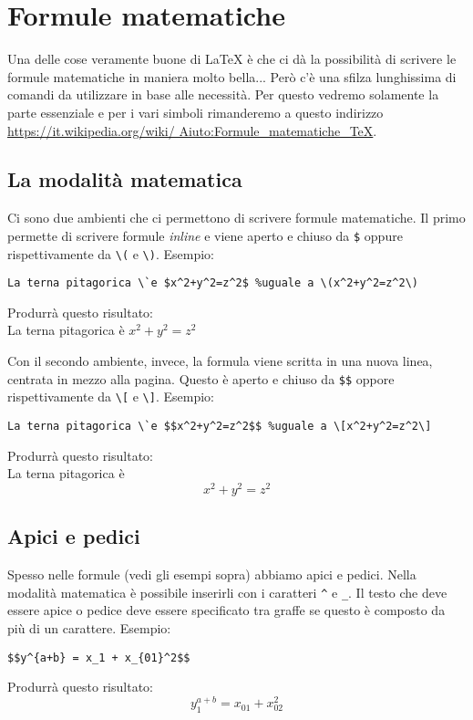 \chapter{Formule matematiche}
Una delle cose veramente buone di \LaTeX{} è che ci dà la possibilità di 
scrivere le formule matematiche in maniera molto bella... Però c'è una sfilza 
lunghissima di comandi da utilizzare in base alle necessità. Per questo 
vedremo solamente la parte essenziale e per i vari simboli rimanderemo a 
questo indirizzo \url{https://it.wikipedia.org/wiki/
Aiuto:Formule_matematiche_TeX}.

\section{La modalità matematica}
Ci sono due ambienti che ci permettono di scrivere formule matematiche. Il 
primo permette di scrivere formule \textit{inline} e viene aperto e chiuso da 
\verb!$! oppure rispettivamente da \verb!\(! e \verb!\)!. Esempio:
\begin{lstlisting}
La terna pitagorica \`e $x^2+y^2=z^2$ %uguale a \(x^2+y^2=z^2\)
\end{lstlisting}
Produrrà questo risultato:\\
La terna pitagorica \`e $x^2+y^2=z^2$
\\ \par
Con il secondo ambiente, invece, la formula viene scritta in una nuova linea, 
centrata in mezzo alla pagina. Questo è aperto e chiuso da \verb!$$! oppore 
rispettivamente da \verb!\[! e \verb!\]!. Esempio:
\begin{lstlisting}
La terna pitagorica \`e $$x^2+y^2=z^2$$ %uguale a \[x^2+y^2=z^2\]
\end{lstlisting}
Produrrà questo risultato:\\
La terna pitagorica \`e $$x^2+y^2=z^2$$

\section{Apici e pedici}
Spesso nelle formule (vedi gli esempi sopra) abbiamo apici e pedici. Nella 
modalità matematica è possibile inserirli con i caratteri \verb!^! e \verb!_!. 
Il testo che deve essere apice o pedice deve essere specificato tra graffe se 
questo è composto da più di un carattere. Esempio:
\begin{lstlisting}
$$y^{a+b} = x_1 + x_{01}^2$$
\end{lstlisting}
Produrrà questo risultato:\\
$$y_1^{a+b} = x_{01} + x_{02}^2$$

